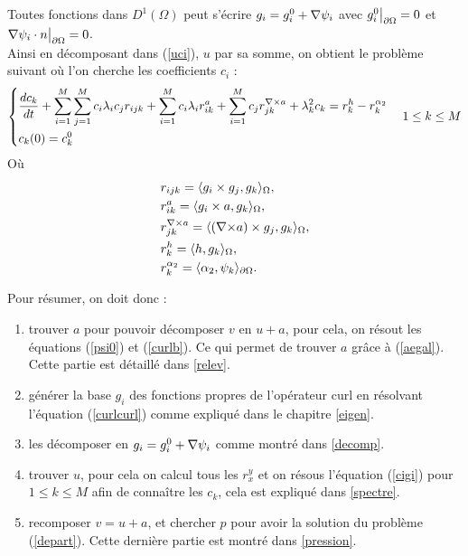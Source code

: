 Toutes fonctions dans $D^1(\Omega)$ peut s'écrire $g_i=g_i^0+{\nabla}\psi_i$ avec $g_i^0{\big\rvert_{\partial\Omega}} = 0$ et $ {\nabla}\psi_i\cdot n{\big\rvert_{\partial\Omega}} = 0$.\\
Ainsi en décomposant dans (\ref{uci}), $u$ par sa somme, on obtient le problème suivant où l'on cherche les coefficients $c_i$ :\\
\begin{eqnarray}
\label{cigi}
\left\{
\begin{aligned}
&\frac{dc_k}{dt}+\sum_{i=1}^M\sum_{j=1}^M c_i\lambda_i c_j r_{ijk} + \sum_{i=1}^M c_i\lambda_i r_{ik}^a + \sum_{i=1}^M c_j r_{jk}^{{\nabla\times} a} + \lambda_k^2 c_k = r_k^h - r_k^{\alpha_2}\\
&c_k(0)=c_k^0
\end{aligned}
\right.\quad
1\leq k\leq M
\end{eqnarray}
Où\\
\[
\begin{aligned}
&r_{ijk} = \langle g_i\times g_j, g_k\rangle_\Omega,\\
&r_{ik}^a=\langle g_i\times a, g_k\rangle_\Omega,\\
&r_{jk}^{{\nabla\times} a}=\langle ({\nabla\times} a)\times g_j, g_k\rangle_\Omega,\\
&r_k^h=\langle h,g_k\rangle_\Omega,\\
&r_k^{\alpha_2} = \langle \alpha_2,\psi_k\rangle_{\partial\Omega}.
\end{aligned}
\]

Pour résumer, on doit donc :
\begin{enumerate}
\item trouver $a$ pour pouvoir décomposer $v$ en $u+a$, pour cela, on résout les équations (\ref{psi0}) et (\ref{curlb}). Ce qui permet de trouver $a$ grâce à (\ref{aegal}). Cette partie est détaillé dans \ref{relev}.
\item générer la base $g_i$ des fonctions propres de l'opérateur curl en résolvant l'équation (\ref{curlcurl}) comme expliqué dans le chapitre \ref{eigen}.
\item les décomposer en $g_i=g_i^0+{\nabla}\psi_i$ comme montré dans \ref{decomp}.
\item trouver $u$, pour cela on calcul tous les $r_x^y$ et on résous l'équation (\ref{cigi}) pour $1\leq k\leq M$ afin de connaître les $c_k$, cela est expliqué dans \ref{spectre}.
\item recomposer $v=u+a$, et chercher $p$ pour avoir la solution du problème (\ref{depart}). Cette dernière partie est montré dans \ref{pression}.
\end{enumerate}

